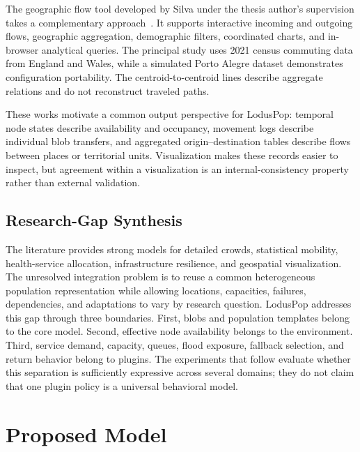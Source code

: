 \documentclass[pdflatex,sn-mathphys-num]{sn-jnl}%
\theoremstyle{thmstyleone}%
\theoremstyle{thmstyletwo}%
\theoremstyle{thmstylethree}%
\begin{document}
The geographic flow tool developed by Silva under the thesis author's supervision takes a complementary approach~\citep{silva2026geospatial}. It supports interactive incoming and outgoing flows, geographic aggregation, demographic filters, coordinated charts, and in-browser analytical queries. The principal study uses 2021 census commuting data from England and Wales, while a simulated Porto Alegre dataset demonstrates configuration portability. The centroid-to-centroid lines describe aggregate relations and do not reconstruct traveled paths.

These works motivate a common output perspective for LodusPop: temporal node states describe availability and occupancy, movement logs describe individual blob transfers, and aggregated origin--destination tables describe flows between places or territorial units. Visualization makes these records easier to inspect, but agreement within a visualization is an internal-consistency property rather than external validation.

\subsection{Research-Gap Synthesis}
\label{related:synthesis}

The literature provides strong models for detailed crowds, statistical mobility, health-service allocation, infrastructure resilience, and geospatial visualization. The unresolved integration problem is to reuse a common heterogeneous population representation while allowing locations, capacities, failures, dependencies, and adaptations to vary by research question. LodusPop addresses this gap through three boundaries. First, blobs and population templates belong to the core model. Second, effective node availability belongs to the environment. Third, service demand, capacity, queues, flood exposure, fallback selection, and return behavior belong to plugins. The experiments that follow evaluate whether this separation is sufficiently expressive across several domains; they do not claim that one plugin policy is a universal behavioral model.

\section{Proposed Model} 
\label{sec:proposed_model}
\end{document}
